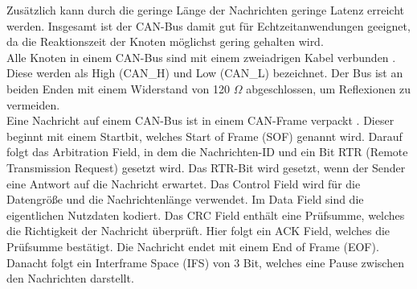 Zusätzlich kann durch die geringe Länge der Nachrichten geringe Latenz erreicht werden. 
Insgesamt ist der CAN-Bus damit gut für Echtzeitanwendungen geeignet, da die Reaktionszeit der Knoten möglichst gering gehalten wird.
\\
Alle Knoten in einem CAN-Bus sind mit einem zweiadrigen Kabel verbunden \cite[Seite 132]{Voss2008}. 
Diese werden als High (CAN\_H) und Low (CAN\_L) 
bezeichnet. Der Bus ist an beiden Enden mit einem Widerstand von 120 $\Omega$ abgeschlossen, um Reflexionen zu vermeiden.
\\
Eine Nachricht auf einem CAN-Bus ist in einem CAN-Frame verpackt \cite[Seite 36]{Voss2008}. 
Dieser beginnt mit einem Startbit, welches Start of Frame (SOF) genannt wird. Darauf folgt das Arbitration Field, 
in dem die Nachrichten-ID und ein Bit RTR (Remote Transmission Request) gesetzt wird. Das RTR-Bit wird gesetzt,
wenn der Sender eine Antwort auf die Nachricht erwartet. Das Control Field wird für die Datengröße und die Nachrichtenlänge
verwendet. Im Data Field sind die eigentlichen Nutzdaten kodiert. Das CRC Field enthält eine Prüfsumme, welches die Richtigkeit
der Nachricht überprüft. Hier folgt ein ACK Field, welches die Prüfsumme bestätigt. Die Nachricht endet mit einem End of Frame (EOF).
Danacht folgt ein Interframe Space (IFS) von 3 Bit, welches eine Pause zwischen den Nachrichten darstellt.

